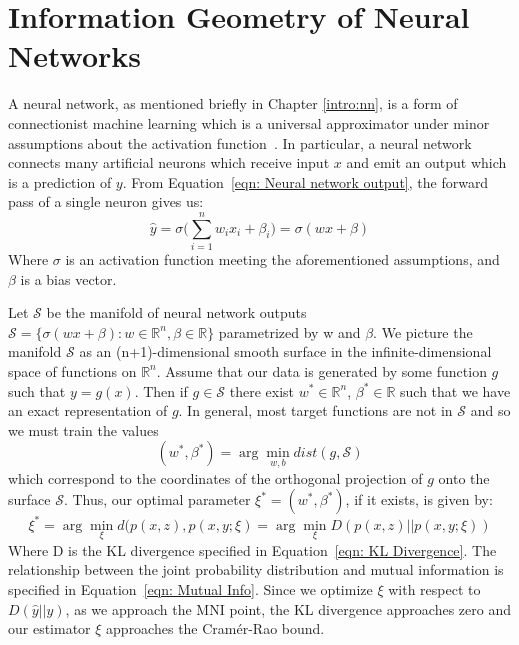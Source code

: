 \section{Information Geometry of Neural Networks}
A neural network, as mentioned briefly in Chapter \ref{intro:nn}, is a form of connectionist machine learning which is a universal approximator under minor assumptions about the activation function~\cite{goodfellow2016deep}.
In particular, a neural network connects many artificial neurons which receive input $x$ and emit an output which is a prediction of $y$. 
From Equation~\ref{eqn: Neural network output}, the forward pass of a single neuron gives us:
\begin{equation}
\hat{y} = \sigma\bigg(\sum_{i=1}^{n}w_i x_i + \beta_{i} \bigg) = \sigma(w x + \beta)	
\end{equation}
Where $\sigma$ is an activation function meeting the aforementioned assumptions, and $\beta$ is a bias vector.

Let $\mathcal{S}$ be the manifold of neural network outputs $\mathcal{S} = \{\sigma(w x + \beta) : w \in \mathbb{R}^n, \beta \in \mathbb{R}\}$ parametrized by w and $\beta$. 
We picture the manifold $\mathcal{S}$ as an (n+1)-dimensional smooth surface in the infinite-dimensional space of functions on $\mathbb{R}^n$. 
Assume that our data is generated by some function $g$ such that $y = g(x)$. 
Then if $g \in \mathcal{S}$ there exist $w^* \in \mathbb{R}^n$, $\beta^* \in \mathbb{R}$ such that we have an exact representation of $g$.
In general, most target functions are not in $\mathcal{S}$ and so we must train the values
\begin{equation}
	(w^*, \beta^*) = \arg \min_{w, b} dist(g, \mathcal{S})
\end{equation}
which correspond to the coordinates of the orthogonal projection of $g$ onto the surface $\mathcal{S}$.
Thus, our optimal parameter $\xi^* = (w^*, \beta^*)$, if it exists, is given by:
\begin{equation}
	\xi^* = \arg \min_{\xi} d(p(x, z), p(x, y; \xi) = \arg \min_{\xi} D(p(x, z) || p(x, y; \xi))
\end{equation}
\noindent Where D is the KL divergence specified in Equation~\ref{eqn: KL Divergence}.
The relationship between the joint probability distribution and mutual information is specified in Equation~\ref{eqn: Mutual Info}.
Since we optimize $\xi$ with respect to $D(\hat{y}||{y})$, as we approach the MNI point, the KL divergence approaches zero and our estimator $\xi$ approaches the Cram\'{e}r-Rao bound.

